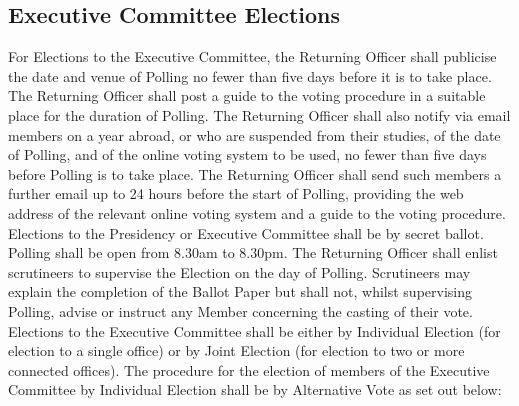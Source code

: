 \subsection{Executive Committee Elections} \label{ssec:ExecCommitteeElections}
\npara For Elections to the Executive Committee, the Returning Officer shall publicise the date and venue of Polling no fewer than five days before it is to take place. The Returning Officer shall post a guide to the voting procedure in a suitable place for the duration of Polling. The Returning Officer shall also notify via email members on a year abroad, or who are suspended from their studies, of the date of Polling, and of the online voting system to be used, no fewer than five days before Polling is to take place. The Returning Officer shall send such members a further email up to 24 hours before the start of Polling, providing the web address of the relevant online voting system and a guide to the voting procedure.
\npara Elections to the Presidency or Executive Committee shall be by secret ballot. Polling shall be open from 8.30am to 8.30pm.
\npara The Returning Officer shall enlist scrutineers to supervise the Election on the day of Polling. Scrutineers may explain the completion of the Ballot Paper but shall not, whilst supervising Polling, advise or instruct any Member concerning the casting of their vote.
\npara Elections to the Executive Committee shall be either by Individual Election (for election to a single office) or by Joint Election (for election to two or more connected offices).
\npara The procedure for the election of members of the Executive Committee by Individual Election shall be by Alternative Vote as set out below:
